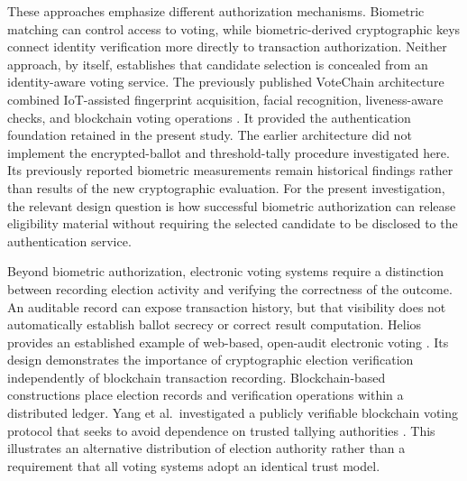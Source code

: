 These approaches emphasize different authorization mechanisms. Biometric matching can control access to voting, while biometric-derived cryptographic keys connect identity verification more directly to transaction authorization. Neither approach, by itself, establishes that candidate selection is concealed from an identity-aware voting service. The previously published VoteChain architecture combined IoT-assisted fingerprint acquisition, facial recognition, liveness-aware checks, and blockchain voting operations \citep{rifat2026biometric}. It provided the authentication foundation retained in the present study. The earlier architecture did not implement the encrypted-ballot and threshold-tally procedure investigated here. Its previously reported biometric measurements remain historical findings rather than results of the new cryptographic evaluation. For the present investigation, the relevant design question is how successful biometric authorization can release eligibility material without requiring the selected candidate to be disclosed to the authentication service.

\label{subsec:related-blockchain}
Beyond biometric authorization, electronic voting systems require a distinction between recording election activity and verifying the correctness of the outcome. An auditable record can expose transaction history, but that visibility does not automatically establish ballot secrecy or correct result computation. Helios provides an established example of web-based, open-audit electronic voting \citep{adida2008helios}. Its design demonstrates the importance of cryptographic election verification independently of blockchain transaction recording. Blockchain-based constructions place election records and verification operations within a distributed ledger. Yang et al.\ investigated a publicly verifiable blockchain voting protocol that seeks to avoid dependence on trusted tallying authorities \citep{yang2020blockchain}. This illustrates an alternative distribution of election authority rather than a requirement that all voting systems adopt an identical trust model.

